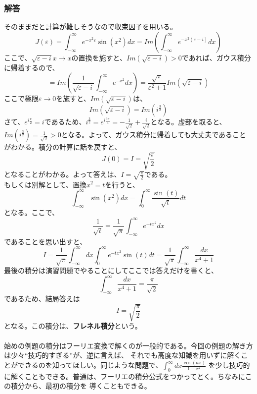 \documentclass[a4j,dvipdfmx]{jsarticle}
\begin{document}
\subsubsection*{解答}
そのままだと計算が難しそうなので収束因子を用いる。
\begin{equation*}
    J(\varepsilon)=\int_{-\infty}^{\infty}e^{-x^2\varepsilon}\sin(x^2)dx=Im\left(\int_{-\infty}^{\infty}e^{-x^2(\varepsilon-i)}dx\right)
\end{equation*}
ここで、$\sqrt{\varepsilon-i}x\to x$の置換を施すと、$Im(\sqrt{\varepsilon-i})>0$であれば、ガウス積分に帰着するので、
\begin{equation*}
    =Im\left(\frac{1}{\sqrt{\varepsilon-i}}\int_{-\infty}^{\infty}e^{-x^2}dx\right)=\frac{\sqrt{\pi}}{\varepsilon^2+1}Im\left(\sqrt{\varepsilon-i}\right)
\end{equation*}
ここで極限$\varepsilon\to 0$を施すと、$Im(\sqrt{\varepsilon-i})$は、
\begin{equation*}
    Im(\sqrt{\varepsilon-i})=Im(i^{\frac{3}{2}})
\end{equation*}
さて、$\displaystyle e^{i\frac{\pi}{2}}=i$であるため、$i^{\frac{3}{2}}=e^{i\frac{3\pi}{4}}=-\frac{1}{\sqrt{2}}+\frac{i}{\sqrt{2}}$となる。虚部を取ると、
$Im(i^{\frac{3}{2}})=\frac{1}{\sqrt{2}}>0$となる。よって、ガウス積分に帰着しても大丈夫であることがわかる。積分の計算に話を戻すと、
\begin{equation*}
    J(0)=I=\sqrt{\frac{\pi}{2}}
\end{equation*}
となることがわかる。よって答えは、$\displaystyle I=\sqrt{\frac{\pi}{2}}$である。\\

もしくは別解として、置換$x^2=t$を行うと、
\begin{equation*}
    \int_{-\infty}^\infty \sin(x^2)dx=\int_{0}^{\infty}\frac{\sin(t)}{\sqrt{t}}dt
\end{equation*}
となる。ここで、
\begin{equation*}
    \frac{1}{\sqrt{t}}=\frac{1}{\sqrt{\pi}}\int_{-\infty}^{\infty}e^{-tx^2}dx
\end{equation*}
であることを思い出すと、
\begin{equation*}
    I=\frac{1}{\sqrt{\pi}}\int_{-\infty}^{\infty}dx\int_{0}^{\infty}e^{-tx^2}\sin(t)dt=\frac{1}{\sqrt{\pi}}\int_{-\infty}^{\infty}\frac{dx}{x^4+1}
\end{equation*}
最後の積分は演習問題でやることにしてここでは答えだけを書くと、
\begin{equation*}
    \int_{-\infty}^{\infty}\frac{dx}{x^4+1}=\frac{\pi}{\sqrt{2}}
\end{equation*}
であるため、結局答えは
\begin{equation*}
    I=\sqrt{\frac{\pi}{2}}
\end{equation*}
となる。この積分は、\textbf{フレネル積分}という。\\
\hrulefill\\
始めの例題の積分はフーリエ変換で解くのが一般的である。今回の例題の解き方は少々``技巧的すぎる''が、逆に言えば、
それでも高度な知識を用いずに解くことができるのを知ってほしい。同じような問題で、$\displaystyle \int_0^\infty dx\frac{\cos(ax)}{1+x^2}$
を少し技巧的に解くこともできる。普通は、フーリエの積分公式をつかってとく。ちなみにこの積分から、最初の積分を
導くこともできる。
\newpage
\end{document}
